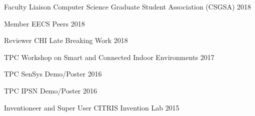 \begin{cvhonors}

  \cvhonor
    {Faculty Liaison}
    {Computer Science Graduate Student Association (CSGSA)}
    {}
    {2018}

  \cvhonor
    {Member}
    {EECS Peers}
    {} %
    {2018}

  \cvhonor
    {Reviewer}
    {CHI Late Breaking Work}
    {}
    {2018}

  \cvhonor
    {TPC}
    {Workshop on Smart and Connected Indoor Environments}
    {}
    {2017}

  \cvhonor
    {TPC}
    {SenSys Demo/Poster}
    {}
    {2016}

  \cvhonor
    {TPC}
    {IPSN Demo/Poster}
    {}
    {2016}

  \cvhonor
    {Inventioneer and Super User}
    {CITRIS Invention Lab}
    {}
    {2015}

\end{cvhonors}

